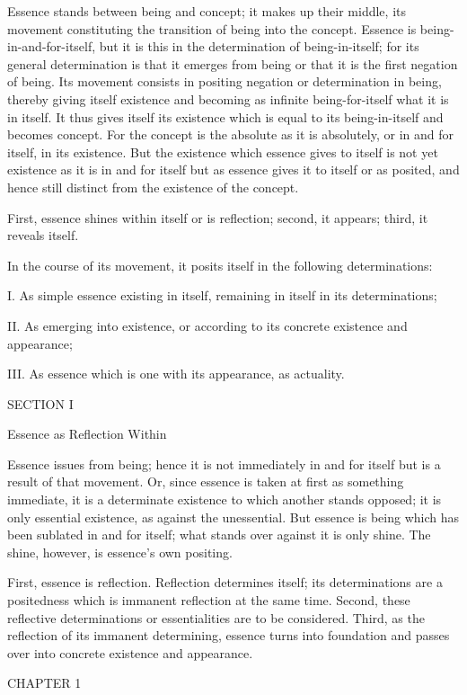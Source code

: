 Essence stands between being and concept;
it makes up their middle,
its movement constituting the transition
of being into the concept.
Essence is being-in-and-for-itself,
but it is this in the determination of being-in-itself;
for its general determination is that it emerges from being
or that it is the first negation of being.
Its movement consists in positing negation
or determination in being, thereby giving
itself existence and becoming
as infinite being-for-itself what it is in itself.
It thus gives itself its existence
which is equal to its being-in-itself
and becomes concept.
For the concept is the absolute as it is absolutely,
or in and for itself, in its existence.
But the existence which essence gives to itself is
not yet existence as it is in and for itself
but as essence gives it to itself or as posited,
and hence still distinct from the existence of the concept.

First, essence shines within itself or is reflection;
second, it appears;
third, it reveals itself.

In the course of its movement,
it posits itself in the following determinations:

I. As simple essence existing in itself,
remaining in itself in its determinations;

II. As emerging into existence,
or according to its concrete existence and appearance;

III. As essence which is one with its appearance,
as actuality.

SECTION I

Essence as Reflection Within

Essence issues from being;
hence it is not immediately in and for itself
but is a result of that movement.
Or, since essence is taken at first as something immediate,
it is a determinate existence to which another stands opposed;
it is only essential existence, as against the unessential.
But essence is being which has been sublated in and for itself;
what stands over against it is only shine.
The shine, however, is essence's own positing.

First, essence is reflection.
Reflection determines itself;
its determinations are a positedness
which is immanent reflection at the same time.
Second, these reflective determinations
or essentialities are to be considered.
Third, as the reflection of its immanent determining,
essence turns into foundation and passes over
into concrete existence and appearance.

CHAPTER 1

